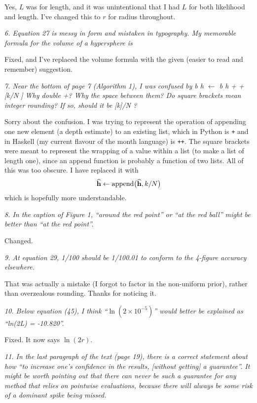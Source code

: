 \documentclass[a4paper, 12pt]{article}
\renewcommand{\quote}{\em \color{orange}}
\begin{document}
Yes, $L$ was for length, and it was unintentional that I had $L$ for both
likelihood and length. I've changed this to $r$ for radius throughout.

{\quote
6. Equation 27 is messy in form and mistaken in typography. My memorable formula for
the volume of a hypersphere is}

Fixed, and I've replaced the volume formula with the given (easier to read and
remember) suggestion.

{\quote
7. Near the bottom of page 7 (Algorithm 1), I was confused by
b
h $\leftarrow$ b
h + + [k/N ]
Why double +? Why the space between them? Do square brackets mean integer rounding? If so, should
it be [k]/N ?}

Sorry about the confusion. I was trying to represent the operation of
appending one new element (a depth estimate)
to an existing list, which in Python is {\tt +}
and in Haskell (my current flavour of the month language) is {\tt ++}. The square brackets were meant to represent
the wrapping of a value within a list (to make a list of length one),
since an append function is probably a function of two lists.
All of this was too obscure. I have replaced it with
\begin{align}
\widehat{\mathbf{h}} \leftarrow \textnormal{append}\big(\widehat{\mathbf{h}}, k/N\big)
\end{align}
which is hopefully more understandable.

{\quote
8. In the caption of Figure 1, “around the red point” or “at the red ball” might be better than “at
the red point”.}

Changed.

{\quote
9. At equation 29,
1/100
should be
1/100.01
to conform to the 4-figure accuracy elsewhere.}

That was actually a mistake (I forgot to factor in the non-uniform prior),
rather than overzealous rounding. Thanks for noticing it.

{\quote
10. Below equation (45), I think ``$\ln(2 \times 10 ^{-5} )$'' would better be explained as ``ln(2L) = -10.820''.}

Fixed. It now says $\ln (2r)$.

{\quote
11. In the last paragraph of the text (page 19), there is a correct statement about how “to increase
one’s confidence in the results, [without getting] a guarantee”. It might be worth pointing out that there
can never be such a guarantee for any method that relies on pointwise evaluations, because there will
always be some risk of a dominant spike being missed.}
\end{document}
